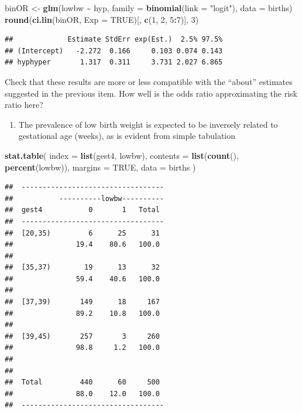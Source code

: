 \documentclass[
]{book}
\newenvironment{Shaded}{\begin{snugshade}}{\end{snugshade}}
\newcommand{\AttributeTok}[1]{\textcolor[rgb]{0.13,0.29,0.53}{#1}}
\newcommand{\ConstantTok}[1]{\textcolor[rgb]{0.56,0.35,0.01}{#1}}
\newcommand{\DecValTok}[1]{\textcolor[rgb]{0.00,0.00,0.81}{#1}}
\newcommand{\FunctionTok}[1]{\textcolor[rgb]{0.13,0.29,0.53}{\textbf{#1}}}
\newcommand{\NormalTok}[1]{#1}
\newcommand{\OtherTok}[1]{\textcolor[rgb]{0.56,0.35,0.01}{#1}}
\newcommand{\SpecialCharTok}[1]{\textcolor[rgb]{0.81,0.36,0.00}{\textbf{#1}}}
\newcommand{\StringTok}[1]{\textcolor[rgb]{0.31,0.60,0.02}{#1}}
\providecommand{\tightlist}{%
  \setlength{\itemsep}{0pt}\setlength{\parskip}{0pt}}
\theoremstyle{definition}
\theoremstyle{definition}
\theoremstyle{definition}
\theoremstyle{definition}
\theoremstyle{remark}
\begin{document}
\begin{Shaded}
\begin{Highlighting}[]
\NormalTok{binOR }\OtherTok{\textless{}{-}} \FunctionTok{glm}\NormalTok{(lowbw }\SpecialCharTok{\textasciitilde{}}\NormalTok{ hyp, }\AttributeTok{family =} \FunctionTok{binomial}\NormalTok{(}\AttributeTok{link =} \StringTok{"logit"}\NormalTok{), }\AttributeTok{data =}\NormalTok{ births)}
\FunctionTok{round}\NormalTok{(}\FunctionTok{ci.lin}\NormalTok{(binOR, }\AttributeTok{Exp =} \ConstantTok{TRUE}\NormalTok{)[, }\FunctionTok{c}\NormalTok{(}\DecValTok{1}\NormalTok{, }\DecValTok{2}\NormalTok{, }\DecValTok{5}\SpecialCharTok{:}\DecValTok{7}\NormalTok{)], }\DecValTok{3}\NormalTok{)}
\end{Highlighting}
\end{Shaded}

\begin{verbatim}
##             Estimate StdErr exp(Est.)  2.5% 97.5%
## (Intercept)   -2.272  0.166     0.103 0.074 0.143
## hyphyper       1.317  0.311     3.731 2.027 6.865
\end{verbatim}

Check that these results are more or less compatible with the
``about'' estimates suggested in the previous item.
How well is the odds ratio approximating the risk ratio here?

\begin{enumerate}
\def\labelenumi{\arabic{enumi}.}
\setcounter{enumi}{2}
\tightlist
\item
  The prevalence of low birth weight is expected to be inversely related
  to gestational age (weeks), as is evident from simple tabulation
\end{enumerate}

\begin{Shaded}
\begin{Highlighting}[]
\FunctionTok{stat.table}\NormalTok{(}
  \AttributeTok{index =} \FunctionTok{list}\NormalTok{(gest4, lowbw),}
  \AttributeTok{contents =} \FunctionTok{list}\NormalTok{(}\FunctionTok{count}\NormalTok{(), }\FunctionTok{percent}\NormalTok{(lowbw)),}
  \AttributeTok{margins =} \ConstantTok{TRUE}\NormalTok{, }\AttributeTok{data =}\NormalTok{ births}
\NormalTok{)}
\end{Highlighting}
\end{Shaded}

\begin{verbatim}
##  ---------------------------------- 
##           ----------lowbw---------- 
##  gest4           0       1   Total  
##  ---------------------------------- 
##  [20,35)         6      25      31  
##               19.4    80.6   100.0  
##                                     
##  [35,37)        19      13      32  
##               59.4    40.6   100.0  
##                                     
##  [37,39)       149      18     167  
##               89.2    10.8   100.0  
##                                     
##  [39,45)       257       3     260  
##               98.8     1.2   100.0  
##                                     
##                                     
##  Total         440      60     500  
##               88.0    12.0   100.0  
##  ----------------------------------
\end{verbatim}
\end{document}
